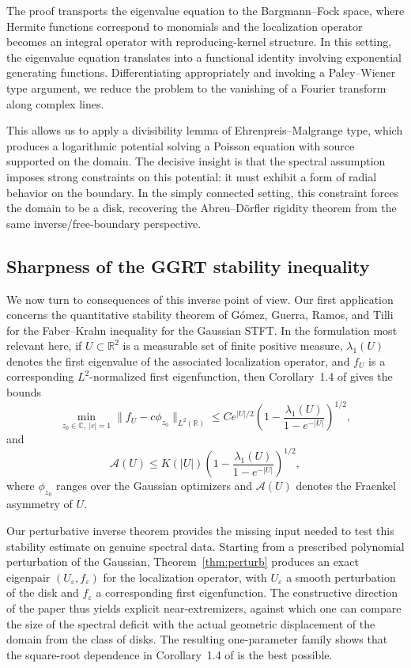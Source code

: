 \documentclass[a4paper,11pt,reqno]{amsart}
\numberwithin{equation}{section}
\theoremstyle{plain} %
\theoremstyle{definition} %
\theoremstyle{remark}
\newcommand{\R}{\mathbb{R}}
\newcommand{\C}{\mathbb{C}}
\begin{document}
The proof transports the eigenvalue equation to the Bargmann--Fock space, where Hermite functions correspond to monomials and the localization operator becomes an integral operator with reproducing-kernel structure. In this setting, the eigenvalue equation translates into a functional identity involving exponential generating functions. Differentiating appropriately and invoking a Paley--Wiener type argument, we reduce the problem to the vanishing of a Fourier transform along complex lines.

This allows us to apply a divisibility lemma of Ehrenpreis--Malgrange type, which produces a logarithmic potential solving a Poisson equation with source supported on the domain. The decisive insight is that the spectral assumption imposes strong constraints on this potential: it must exhibit a form of radial behavior on the boundary. In the simply connected setting, this constraint forces the domain to be a disk, recovering the Abreu--D\"orfler rigidity theorem from the same inverse/free-boundary perspective.

\subsection{Sharpness of the GGRT stability inequality}

We now turn to consequences of this inverse point of view. Our first application concerns the quantitative stability theorem of G\'omez, Guerra, Ramos, and Tilli for the Faber--Krahn inequality for the Gaussian STFT. In the formulation most relevant here, if $U\subset \R^2$ is a measurable set of finite positive measure, $\lambda_1(U)$ denotes the first eigenvalue of the associated localization operator, and $f_U$ is a corresponding $L^2$-normalized first eigenfunction, then Corollary~1.4 of \cite{Gomez-Guerra-Ramos-Tilli} gives the bounds
\[
\min_{z_0\in\C,\ |c|=1}\|f_U-c\phi_{z_0}\|_{L^2(\R)}
\leq
C e^{|U|/2}
\left(
1-\frac{\lambda_1(U)}{1-e^{-|U|}}
\right)^{1/2},
\]
and
\[
\mathcal A(U)
\leq
K(|U|)
\left(
1-\frac{\lambda_1(U)}{1-e^{-|U|}}
\right)^{1/2},
\]
where $\phi_{z_0}$ ranges over the Gaussian optimizers and $\mathcal A(U)$ denotes the Fraenkel asymmetry of $U$.

Our perturbative inverse theorem provides the missing input needed to test this stability estimate on genuine spectral data. Starting from a prescribed polynomial perturbation of the Gaussian, Theorem~\ref{thm:perturb} produces an exact eigenpair $(U_\varepsilon,f_\varepsilon)$ for the localization operator, with $U_\varepsilon$ a smooth perturbation of the disk and $f_\varepsilon$ a corresponding first eigenfunction. The constructive direction of the paper thus yields explicit near-extremizers, against which one can compare the size of the spectral deficit with the actual geometric displacement of the domain from the class of disks. The resulting one-parameter family shows that the square-root dependence in Corollary~1.4 of \cite{Gomez-Guerra-Ramos-Tilli} is the best possible.
\end{document}
